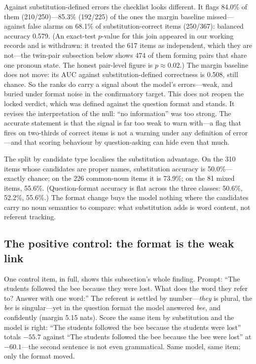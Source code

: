 \documentclass[11pt]{article}
\begin{document}
Against substitution-defined errors the checklist looks different.
It flags 84.0\% of them (210/250)---85.3\% (192/225) of the ones the
margin baseline missed---against false alarms on 68.1\% of
substitution-correct items (250/367): balanced accuracy 0.579. (An exact-test $p$-value for this join appeared in our working records and is withdrawn: it treated the 617 items as independent, which they are not---the twin-pair subsection below shows 474 of them forming pairs that share one pronoun state. The honest pair-level figure is $p \approx 0.02$.) The margin baseline does
not move: its AUC against substitution-defined correctness is 0.508,
still chance. So the ranks do carry a signal about the model's
errors---weak, and buried under format noise in the confirmatory
target. This does not reopen the locked verdict, which was defined
against the question format and stands. It revises the
interpretation of the null: ``no information'' was too strong. The
accurate statement is that the signal is far too weak to warn
with---a flag that fires on two-thirds of correct items is not a
warning under any definition of error---and that scoring behaviour by question-asking can hide even that much.

The split by candidate type localises the substitution advantage. On
the 310 items whose candidates are proper names, substitution
accuracy is 50.0\%---exactly chance; on the 226 common-noun items it
is 73.9\%; on the 81 mixed items, 55.6\%. (Question-format accuracy
is flat across the three classes: 50.6\%, 52.2\%, 55.6\%.) The
format change buys the model nothing where the candidates carry no
noun semantics to compare: what substitution adds is word content,
not referent tracking.

\subsection{The positive control: the format is the weak link}

One control item, in full, shows this subsection's whole finding.
Prompt: ``The students followed the bee because they were lost.
What does the word they refer to? Answer with one word:'' The
referent is settled by number---\emph{they} is plural, the
\emph{bee} is singular---yet in the question format the model
answered \emph{bee}, and confidently (margin 5.15 nats). Score the
same item by substitution and the model is right: ``The students
followed the bee because the students were lost'' totals $-55.7$
against ``The students followed the bee because the bee were lost''
at $-60.1$---the second sentence is not even grammatical. Same
model, same item; only the format moved.
\end{document}
